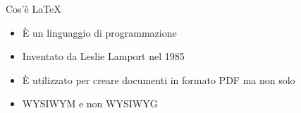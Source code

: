 \begin{frame}{Cos'è \LaTeX}
	\begin{itemize}
		\item È un linguaggio di programmazione
		\item Inventato da Leslie Lamport nel 1985
		\item È utilizzato per creare documenti in formato PDF ma non solo
		\item WYSIWYM e non WYSIWYG
	\end{itemize}
\end{frame}
